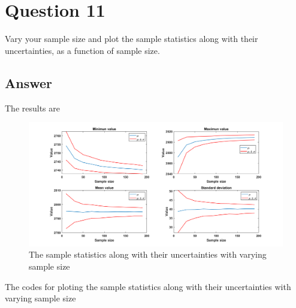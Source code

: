 \documentclass[
	12pt, %
]{fphw}
\begin{document}
 

 \section*{Question 11 }

\begin{problem}
Vary your sample size and plot the sample statistics along with their uncertainties, as a
function of sample size.
	
\end{problem}

\subsection*{Answer}

The results are

\begin{figure}[htbp]
	\centering
	\includegraphics[width=0.8\columnwidth]{sampleuncern.png} 
	\caption{ The sample statistics along with their uncertainties with varying sample size}
\end{figure}

The codes for ploting the sample statistics along with their uncertainties with varying sample size
\end{document}

